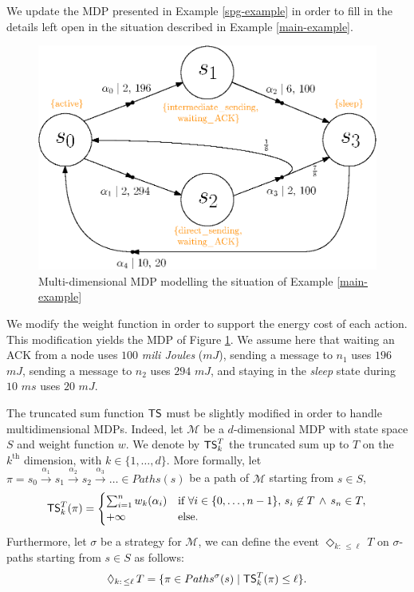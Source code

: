 \begin{example}
  We update the MDP presented in Example \ref{spg-example} in order to fill in the details left open in the situation described in Example \ref{main-example}.
  \begin{figure}[h]
    \centering
    \includegraphics[width=0.6\linewidth]{resources/mdmdp2}
    \captionsetup{justification=centering}
    \caption{Multi-dimensional MDP modelling the situation of Example \ref{main-example}}
    \label{multi-mdp}
  \end{figure}
  We modify the weight function in order to support the energy cost of each action. This modification yields the MDP of Figure \ref{multi-mdp}.
  We assume here that waiting an ACK from a node uses $100$ \textit{mili Joules} ($mJ$), sending a message to $n_1$ uses $196$ $mJ$, sending a message to $n_2$ uses $294$ $mJ$, and staying in the \textit{sleep} state during $10$ $ms$ uses $20$ $mJ$.
\end{example}

\begin{remark}
  The truncated sum function $\text{\sffamily TS}$ must be slightly modified in order to handle multidimensional MDPs.
  Indeed, let $\mathcal{M}$ be a $d$-dimensional MDP with state space $S$ and weight function $w$.
  We denote by $\text{\sffamily TS}^T_{k}$ the truncated sum up to $T$ on the $k^\text{th}$ dimension, with $k \in \{1, \dots, d\}$.
  More formally, let $\pi = s_0 \xrightarrow{\alpha_1} s_1 \xrightarrow{\alpha_2} s_2 \xrightarrow{\alpha_3} \dots \in Paths(s)$ be a path of $\mathcal{M}$ starting from $s \in S$,
  \[
  \text{\sffamily TS}^T_k(\pi) = \begin{cases}
    \sum_{i=1}^{n} w_k(\alpha_i) & \text{if } \forall i \in \{0, \dots, n-1\}, \, s_{i} \not\in T \, \wedge \, s_n \in T, \\
    + \infty & \text{else}.
  \end{cases}
  \]
  Furthermore, let $\sigma$ be a strategy for $\mathcal{M}$, we can define the event $\Diamond_{k: \, \leq \ell} \, T$ on $\sigma$-paths  starting from $s \in S$ as follows:
  \[
    \Diamond_{k:\,\leq \ell}\,T=\{\pi \in Paths^\sigma(s) \; | \; \text{\sffamily TS}^T_k(\pi) \leq \ell \}.
  \]
\end{remark}

